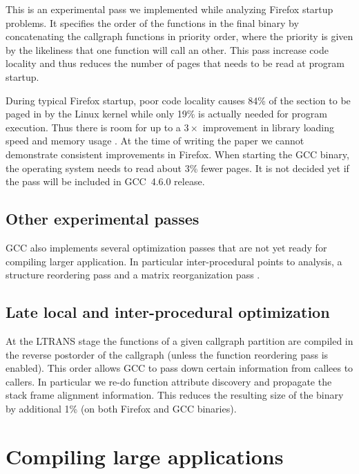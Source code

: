 \documentclass[final]{ols}
\begin{document}
This is an experimental pass we implemented while analyzing Firefox startup
problems.  It specifies the order of the functions in the final binary by concatenating
the callgraph functions in  priority order, where the priority is given by the likeliness
that one function will call an other.  This pass increase code locality and
thus reduces the number of pages that needs to be read at program startup.

During typical Firefox startup, poor code locality causes 84\% of the
 section to be paged in by the Linux kernel while only 19\% is
actually needed for
program execution. Thus there is room for up to a $3\times$ improvement in library
loading speed and memory usage \cite{Glandiumblog}.
At the time of writing the paper we cannot demonstrate consistent improvements
in Firefox.  When starting the GCC binary, the operating system needs to read
about 3\% fewer pages.  It is not decided yet if the pass will be included in GCC~4.6.0
release.

\subsection{Other experimental passes}

GCC also implements several optimization passes that are not yet ready for
compiling larger application. In particular inter-procedural points to
analysis, a structure reordering pass \cite{structreorg} and a matrix
reorganization pass \cite{maxtrixreorg}. 

\subsection{Late local and inter-procedural optimization}

At the LTRANS stage the functions of a given callgraph partition are compiled in the
reverse postorder of the callgraph (unless the function reordering pass is
enabled).  This order allows GCC to pass down certain information from callees to
callers.  In particular we re-do function attribute discovery and propagate
the stack frame alignment information.  This reduces the resulting size
of the binary by additional 1\% (on both Firefox and GCC binaries). %

\section{Compiling large applications}
\label{largesect}
\end{document}
